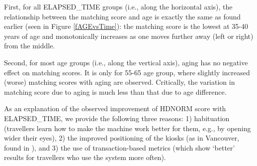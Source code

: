 \documentclass{cta-author}%
\newcommand{\cmt}[1]{}
\begin{document}




First, for all ELAPSED\_TIME groups (i.e., along the horizontal axis), 
the relationship between the matching score and age is exactly the same as found earlier (seen in Figure \ref{fAGEvsTime}):
the matching score is the lowest at 35-40 years of age and monotonically increases as one moves further away (left or right) from the middle. %

Second, for most age groups (i.e., along the vertical axis), aging has no negative effect on matching scores. 
It is only for 55-65 age group, where slightly increased (worse) matching scores with aging are observed.
Critically, the variation in matching score due to aging is much less than that due to age difference.

\cmt{
No increase of HDRAW with ELAPSED\_TIME (i.e., along the vertical axis) for either age group is observed, which 
confirms results reported in \cite{irexVI,aging3}.
 However,  an increase of HDNORM with Age (i.e., along the horizontal axis) for travellers over 40 years of age is observed.
 }

As an explanation of the observed improvement of HDNORM score with ELAPSED\_TIME, we provide the following three reasons:  
 1) habituation (travellers learn how to make the machine work better for them, e.g., by opening wider their eyes), 2) the improved positioning of the kiosks (as in Vancouver, found in \cite{Bowyer-BTAS2016}),  and 3) the use of transaction-based metrics (which show `better' results for travellers who use the system more often). 






\end{document}
